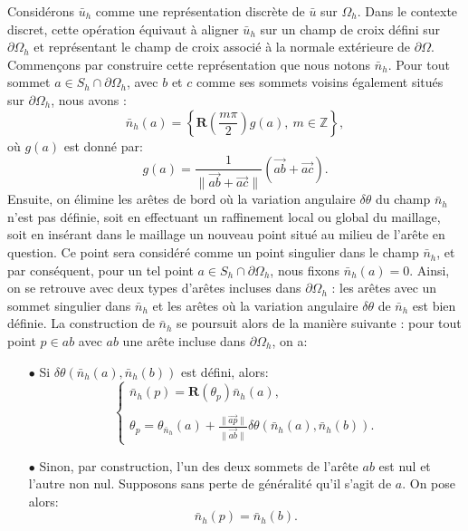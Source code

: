 Considérons $\bar{u}_h$ comme une représentation discrète de $\bar{u}$ sur $\Omega_h$. Dans le contexte discret, cette opération équivaut à aligner $\bar{u}_h$ sur un champ de croix défini sur $\partial\Omega_h$ et représentant le champ de croix associé à la normale extérieure de $\partial\Omega$. Commençons par construire cette représentation que nous notons $\bar{n}_h$. Pour tout sommet $a\in S_h\cap\partial\Omega_h$, avec $b$ et $c$ comme ses sommets voisins également situés sur $\partial\Omega_h$, nous avons :
\begin{equation}
\bar{n}_h(a)=\displaystyle\left\{\mathbf{R}\left(\frac{m\pi}{2}\right)g(a),~ m\in\mathbb{Z}\right\},
\end{equation}
où $g(a)$ est donné par:
\begin{equation}
\label{eqn:n_reconstruit}
g(a)=\displaystyle\frac{1}{\|\overrightarrow{ab}+\overrightarrow{ac}\|}\left(\overrightarrow{ab}+\overrightarrow{ac}\right).
\end{equation}
Ensuite, on élimine les arêtes de bord où la variation angulaire $\delta\theta$ du champ $\bar{n}_h$ n'est pas définie, soit en effectuant un raffinement local ou global du maillage, soit en insérant dans le maillage un nouveau point situé au milieu de l'arête en question. Ce point sera considéré comme un point singulier dans le champ $\bar{n}_h$, et par conséquent, pour un tel point $a\in S_h\cap\partial\Omega_h$, nous fixons $\bar{n}_h(a)=0$. Ainsi, on se retrouve avec deux types d'arêtes incluses dans $\partial\Omega_h$ : les arêtes avec un sommet singulier dans $\bar{n}_h$ et les arêtes où la variation angulaire $\delta\theta$ de $\bar{n}_h$ est bien définie. La construction de $\bar{n}_h$ se poursuit alors de la manière suivante : pour tout point $p\in ab$ avec $ab$ une arête incluse dans $\partial\Omega_h$, on a:\\
\begin{itemize}
\item[$\bullet$] Si $\delta\theta(\bar{n}_h(a), \bar{n}_h(b))$ est défini, alors:
 $$
 \left\{
 \begin{array}{l}
 \bar{n}_h(p)=\mathbf{R}(\theta_p)\bar{n}_h(a),\\\\
 \theta_p = \theta_{\bar{n}_h}(a)+\displaystyle\frac{\|\overrightarrow{ap}\|}{\|\overrightarrow{ab}\|}\delta\theta(\bar{n}_h(a), \bar{n}_h(b)).
 \end{array}
 \right.
 $$
 \item[$\bullet$] Sinon, par construction, l'un des deux sommets de l'arête $ab$ est nul et l'autre non nul. Supposons sans perte de généralité qu'il s'agit de $a$. On pose alors:
 $$
 \bar{n}_h(p)=\bar{n}_h(b).
 $$
\end{itemize}
